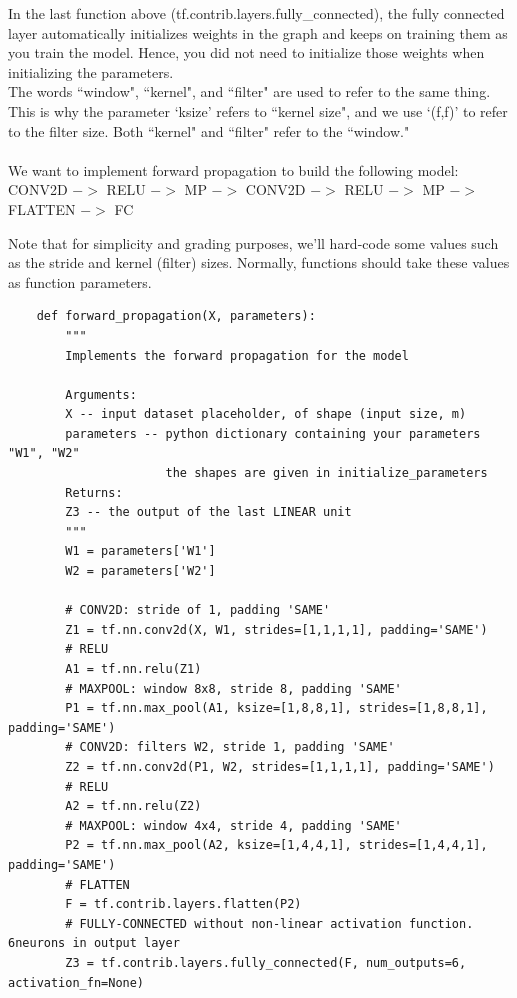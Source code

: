 \documentclass[11pt, a4paper]{article}
\begin{document}
\begin{spacing}{1.1}
	In the last function above (tf.contrib.layers.fully\_connected), the fully connected layer automatically initializes weights in the graph and keeps on training them as you train the model. Hence, you did not need to initialize those weights when initializing the parameters. \vspace*{1mm}\\
	The words ``window", ``kernel", and ``filter" are used to refer to the same thing.  This is why the parameter `ksize' refers to ``kernel size", and we use `(f,f)' to refer to the filter size.  Both ``kernel" and ``filter" refer to the ``window." \\~\\
	We want to implement forward propagation to build the following model: \\
	CONV2D $->$ RELU $->$ MP $->$ CONV2D $->$ RELU $->$ MP $->$ FLATTEN $->$ FC	\newpage

	\noindent Note that for simplicity and grading purposes, we'll hard-code some values such as the stride and kernel (filter) sizes. Normally, functions should take these values as function parameters.
	\begin{lstlisting}
	def forward_propagation(X, parameters):
		"""
		Implements the forward propagation for the model
			
		Arguments:
		X -- input dataset placeholder, of shape (input size, m)
		parameters -- python dictionary containing your parameters "W1", "W2"
		              the shapes are given in initialize_parameters
		Returns:
		Z3 -- the output of the last LINEAR unit
		"""
		W1 = parameters['W1']
		W2 = parameters['W2']
		
		# CONV2D: stride of 1, padding 'SAME'
		Z1 = tf.nn.conv2d(X, W1, strides=[1,1,1,1], padding='SAME')
		# RELU
		A1 = tf.nn.relu(Z1)
		# MAXPOOL: window 8x8, stride 8, padding 'SAME'
		P1 = tf.nn.max_pool(A1, ksize=[1,8,8,1], strides=[1,8,8,1], padding='SAME')
		# CONV2D: filters W2, stride 1, padding 'SAME'
		Z2 = tf.nn.conv2d(P1, W2, strides=[1,1,1,1], padding='SAME')
		# RELU
		A2 = tf.nn.relu(Z2)
		# MAXPOOL: window 4x4, stride 4, padding 'SAME'
		P2 = tf.nn.max_pool(A2, ksize=[1,4,4,1], strides=[1,4,4,1], padding='SAME')
		# FLATTEN
		F = tf.contrib.layers.flatten(P2)
		# FULLY-CONNECTED without non-linear activation function. 6neurons in output layer
		Z3 = tf.contrib.layers.fully_connected(F, num_outputs=6, activation_fn=None)
		

\end{lstlisting}
\end{spacing}
\end{document}
